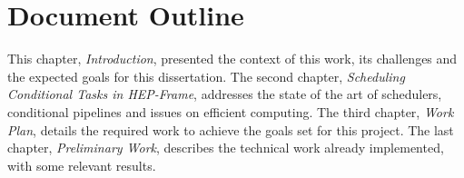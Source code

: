 

\section{Document Outline} 


This chapter, \textit{Introduction}, presented the context of this work, its challenges and  the expected goals for this dissertation. 
The second chapter, \textit{Scheduling Conditional Tasks in HEP-Frame}, addresses the state of the art of schedulers, conditional pipelines and issues on efficient computing.
The third chapter, \textit{Work Plan}, details the required work to achieve the goals set for this project.
The last chapter, \textit{Preliminary Work}, describes the technical work already implemented, with some relevant results.
    